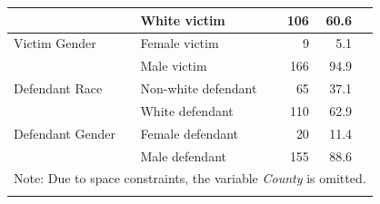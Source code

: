 \documentclass[12pt,article]{article}
\begin{document}
{\begin{longtable}{ll|rrr}
   & White victim & 106 & 60.6 \\ 
\hline
Victim Gender & Female victim & 9 & 5.1\\ 
   & Male victim & 166 & 94.9 \\ 
\hline
Defendant Race & Non-white defendant & 65 & 37.1 \\ 
   & White defendant & 110 & 62.9 \\ 
\hline
Defendant Gender & Female defendant & 20 & 11.4 \\ 
   & Male defendant & 155 & 88.6 \\ 
   \hline
  \multicolumn{5}{l}{Note: Due to space constraints, the variable \emph{County} is omitted.} \\
\label{Summary Statistics for Categorical Variables}
\end{longtable}
}

\pagebreak

\doublespacing
\end{document}
